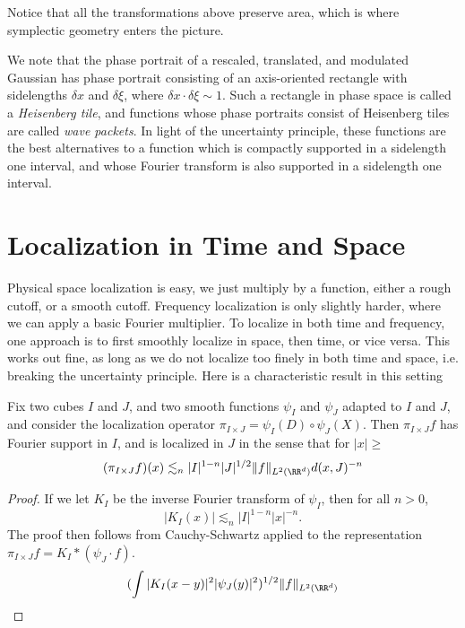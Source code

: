 Notice that all the transformations above preserve area, which is where symplectic geometry enters the picture.

We note that the phase portrait of a rescaled, translated, and modulated Gaussian has phase portrait consisting of an axis-oriented rectangle with sidelengths $\delta x$ and $\delta \xi$, where $\delta x \cdot \delta \xi \sim 1$. Such a rectangle in phase space is called a \emph{Heisenberg tile}, and functions whose phase portraits consist of Heisenberg tiles are called \emph{wave packets}. In light of the uncertainty principle, these functions are the best alternatives to a function which is compactly supported in a sidelength one interval, and whose Fourier transform is also supported in a sidelength one interval.

\section{Localization in Time and Space}

Physical space localization is easy, we just multiply by a function, either a rough cutoff, or a smooth cutoff. Frequency localization is only slightly harder, where we can apply a basic Fourier multiplier. To localize in both time and frequency, one approach is to first smoothly localize in space, then time, or vice versa. This works out fine, as long as we do not localize too finely in both time and space, i.e. breaking the uncertainty principle. Here is a characteristic result in this setting

\begin{lemma}
  Fix two cubes $I$ and $J$, and two smooth functions $\psi_I$ and $\psi_J$ adapted to $I$ and $J$, and consider the localization operator $\pi_{I \times J} = \psi_I(D) \circ \psi_J(X)$. Then $\pi_{I \times J} f$ has Fourier support in $I$, and is localized in $J$ in the sense that for $|x| \geq $
  \[ (\pi_{I \times J} f)(x) \lesssim_n |I|^{1-n} |J|^{1/2} \| f \|_{L^2(\RR^d)} d(x,J)^{-n} \]
\end{lemma}
\begin{proof}
  If we let $K_I$ be the inverse Fourier transform of $\psi_I$, then for all $n > 0$,
  \[ |K_I(x)| \lesssim_n |I|^{1-n} |x|^{-n}. \]
  The proof then follows from Cauchy-Schwartz applied to the representation $\pi_{I \times J} f = K_I * (\psi_J \cdot f)$.
  \[ (\int |K_I(x-y)|^2 |\psi_J(y)|^2)^{1/2} \| f \|_{L^2(\RR^d)} \]
\end{proof}

















